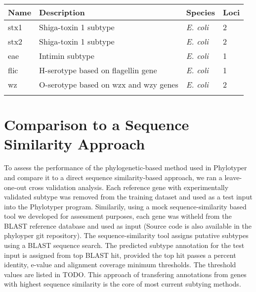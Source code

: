 \documentclass{bioinfo}
\begin{document}
\begin{table}[!t]
 {\begin{tabular}{@{}llll@{}}\toprule Name &
Description & Species & Loci\\\midrule
stx1 & Shiga-toxin 1 subtype & {\it E. coli} & 2 \\
stx2 & Shiga-toxin 1 subtype & {\it E. coli} & 2\\
eae & Intimin subtype & {\it E. coli} & 1\\
flic & H-serotype based on flagellin gene & {\it E. coli} & 1\\
wz & O-serotype based on wzx and wzy genes & {\it E. coli} & 2\\\botrule
\end{tabular}}{}
\end{table}

\section{Comparison to a Sequence Similarity Approach}

To assess the performance of the phylogenetic-based method used in Phylotyper and compare it to a direct sequence similarity-based approach, we ran a leave-one-out cross validation analysis. 
Each reference gene with experimentally validated subtype was removed from the training dataset and used as a test input into the Phylotyper program. 
Similarily, using a mock sequence-similarity based tool we developed for assessment purposes, each gene was witheld from the BLAST reference database and used as input (Source code is also available in the phyloyper git repository).
The sequence-similarity tool assigns putative subtypes using a BLAST sequence search.  
The predicted subtype annotation for the test input is assigned from top BLAST hit, provided the top hit passes a percent identity, e-value and alignment coverage minimum thresholds.  
The threshold values are listed in TODO.
This approach of transfering annotations from genes with highest sequence similarity is the core of most current subtying methods.
\end{document}
